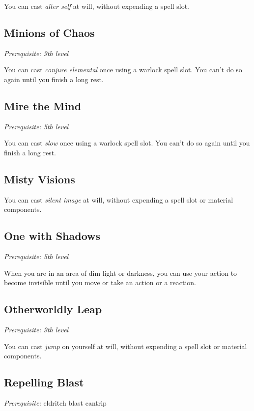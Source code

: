 You can cast \textit{alter self} at will, without expending a spell slot.

\subsection{Minions of Chaos}

\textit{Prerequisite: 9th level}

You can cast \textit{conjure elemental} once using a warlock spell slot. You can't do so again until you finish a long rest.

\subsection{Mire the Mind}

\textit{Prerequisite: 5th level}

You can cast \textit{slow} once using a warlock spell slot. You can't do so again until you finish a long rest.

\subsection{Misty Visions}

You can cast \textit{silent image} at will, without expending a spell slot or material components.

\subsection{One with Shadows}

\textit{Prerequisite: 5th level}

When you are in an area of dim light or darkness, you can use your action to become invisible until you move or take an action or a reaction.

\subsection{Otherworldly Leap}

\textit{Prerequisite: 9th level}

You can cast \textit{jump} on yourself at will, without expending a spell slot or material components.

\subsection{Repelling Blast}

\textit{Prerequisite:} eldritch blast cantrip

